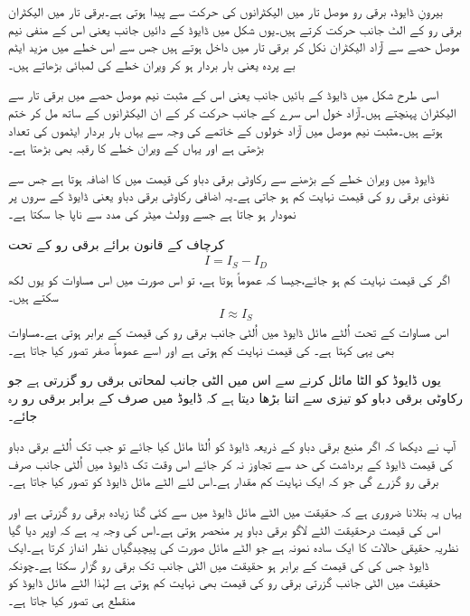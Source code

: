 بیرونِ ڈایوڈ، برقی رو موصل تار میں الیکٹرانوں کی حرکت سے پیدا ہوتی ہے۔برقی تار میں الیکٹران برقی رو  کے الٹ جانب حرکت کرتے ہیں۔یوں شکل میں ڈایوڈ کے دائیں جانب یعنی اس کے منفی نیم موصل حصے سے آزاد الیکٹران نکل کر برقی تار میں داخل ہوتے ہیں جس سے اس خطے میں مزید ایٹم  بے پردہ یعنی بار بردار ہو کر ویران خطے کی لمبائی بڑھاتے ہیں۔

اسی طرح شکل میں ڈایوڈ کے بائیں جانب یعنی اس کے مثبت نیم موصل حصے میں برقی تار سے الیکٹران پہنچتے ہیں۔آزاد خول اس سرے کے جانب حرکت کر کے ان الیکٹرانوں کے ساتھ مل کر ختم ہوتے ہیں۔مثبت نیم موصل میں آزاد خولوں کے خاتمے کی وجہ سے یہاں بار بردار ایٹموں کی تعداد بڑھتی ہے اور یہاں کے ویران خطے کا رقبہ بھی بڑھتا ہے۔

ڈایوڈ میں ویران خطے کے بڑھنے سے رکاوٹی برقی دباو کی قیمت میں  کا اضافہ ہوتا ہے جس سے نفوذی برقی رو  کی قیمت نہایت کم ہو جاتی ہے۔یہ اضافی رکاوٹی برقی دباو یعنی   ڈایوڈ کے سروں پر نمودار ہو جاتا ہے  جسے وولٹ میٹر کی مدد سے ناپا جا سکتا ہے۔

کرچاف کے قانون برائے برقی رو کے تحت 
\begin{align}
I=I_S-I_D
\end{align}
اگر  کی قیمت نہایت کم ہو جائے،جیسا کہ عموماً ہوتا ہے، تو اس صورت میں اس مساوات کو یوں لکھ سکتے ہیں۔
\begin{align}
I \approx I_S
\end{align}
اس مساوات کے تحت اُلٹے مائل ڈایوڈ میں اُلٹی جانب برقی رو کی قیمت  کے برابر ہوتی ہے۔مساوات   بھی یہی کہتا ہے۔ کی قیمت نہایت کم ہوتی ہے اور اسے عموماً صفر تصور کیا جاتا ہے۔

یوں ڈایوڈ کو الٹا مائل کرنے سے اس میں الٹی جانب لمحاتی برقی رو گزرتی ہے جو رکاوٹی برقی دباو کو تیزی سے اتنا بڑھا دیتا ہے کہ ڈایوڈ میں صرف   کے برابر برقی رو رہ جائے۔

آپ نے دیکھا کہ اگر منبع برقی دباو  کے ذریعہ ڈایوڈ کو اُلٹا مائل کیا جائے تو جب تک اُلٹے برقی دباو کی قیمت ڈایوڈ کے برداشت کی حد سے تجاوز نہ کر جائے اس وقت تک ڈایوڈ میں اُلٹی جانب صرف  برقی رو گزرے گی جو کہ ایک نہایت کم مقدار ہے۔اس لئے الٹے مائل  ڈایوڈ کو   تصور کیا جاتا ہے۔

یہاں یہ بتلانا ضروری ہے کہ حقیقت میں الٹے مائل  ڈایوڈ میں   سے کئی گنا زیادہ برقی رو گزرتی ہے اور اس کی قیمت درحقیقت الٹے لاگو برقی دباو پر منحصر ہوتی ہے۔اس کی وجہ یہ ہے کہ اوپر دیا گیا نظریہ حقیقی حالات کا ایک سادہ نمونہ ہے جو الٹے مائل صورت کی پیچیدگیاں نظر انداز کرتا ہے۔ایک ڈایوڈ جس کی  کی قیمت  کے برابر ہو حقیقت میں الٹی جانب    تک برقی رو گزار سکتا ہے۔چونکہ حقیقت میں الٹی جانب گزرتی برقی رو کی قیمت بھی نہایت کم ہوتی ہے لہٰذا الٹے مائل  ڈایوڈ کو منقطع ہی تصور کیا جاتا ہے۔


